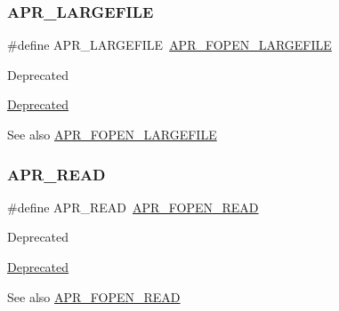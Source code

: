 \subsubsection{\texorpdfstring{A\+P\+R\+\_\+\+L\+A\+R\+G\+E\+F\+I\+LE}{APR\_LARGEFILE}}
{\footnotesize\ttfamily \#define A\+P\+R\+\_\+\+L\+A\+R\+G\+E\+F\+I\+LE~\mbox{\hyperlink{group__apr__file__open__flags_gaf6cfaa4789e6264afd186235f0adbc22}{A\+P\+R\+\_\+\+F\+O\+P\+E\+N\+\_\+\+L\+A\+R\+G\+E\+F\+I\+LE}}}

\begin{DoxyRefDesc}{Deprecated}
\item[\mbox{\hyperlink{deprecated__deprecated000030}{Deprecated}}]\end{DoxyRefDesc}
\begin{DoxySeeAlso}{See also}
\mbox{\hyperlink{group__apr__file__open__flags_gaf6cfaa4789e6264afd186235f0adbc22}{A\+P\+R\+\_\+\+F\+O\+P\+E\+N\+\_\+\+L\+A\+R\+G\+E\+F\+I\+LE}} 
\end{DoxySeeAlso}
\mbox{\label{group__apr__file__open__flags_ga0021db78d799d1c8825b701c7efee483}} 
\subsubsection{\texorpdfstring{A\+P\+R\+\_\+\+R\+E\+AD}{APR\_READ}}
{\footnotesize\ttfamily \#define A\+P\+R\+\_\+\+R\+E\+AD~\mbox{\hyperlink{group__apr__file__open__flags_gaf9e7303f028b130ff7d4b209d6662d7d}{A\+P\+R\+\_\+\+F\+O\+P\+E\+N\+\_\+\+R\+E\+AD}}}

\begin{DoxyRefDesc}{Deprecated}
\item[\mbox{\hyperlink{deprecated__deprecated000017}{Deprecated}}]\end{DoxyRefDesc}
\begin{DoxySeeAlso}{See also}
\mbox{\hyperlink{group__apr__file__open__flags_gaf9e7303f028b130ff7d4b209d6662d7d}{A\+P\+R\+\_\+\+F\+O\+P\+E\+N\+\_\+\+R\+E\+AD}} 
\end{DoxySeeAlso}
\mbox{\label{group__apr__file__open__flags_ga17e216aadb23254580258889e10c53f3}} 
